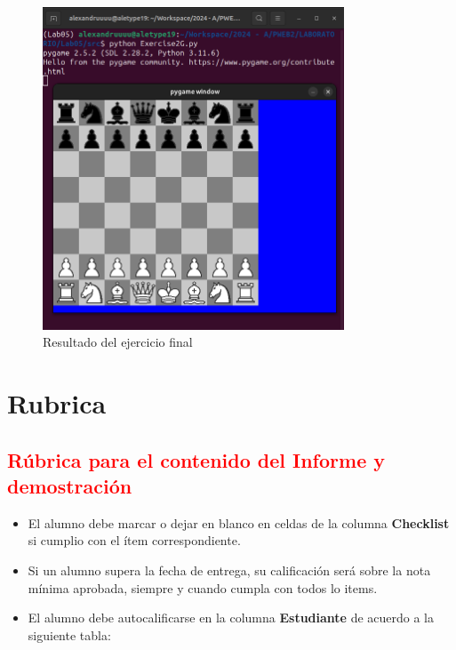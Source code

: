 \documentclass{article}
\begin{document}
\begin{itemize}
\begin{figure}[H]
    \centering
    \includegraphics[width=0.8\textwidth]{img/7.png}
    \caption{Resultado del ejercicio final}
    \label{fig:ejerciciofinal}
\end{figure}





\section{Rubrica}	
\subsection{\textcolor{red}{Rúbrica para el contenido del Informe y demostración}}
	\begin{itemize}			
		\item El alumno debe marcar o dejar en blanco en celdas de la columna \textbf{Checklist} si cumplio con el ítem correspondiente.
		\item Si un alumno supera la fecha de entrega,  su calificación será sobre la nota mínima aprobada, siempre y cuando cumpla con todos lo items.
		\item El alumno debe autocalificarse en la columna \textbf{Estudiante} de acuerdo a la siguiente tabla:
	

\end{itemize}
\end{itemize}
\end{document}
